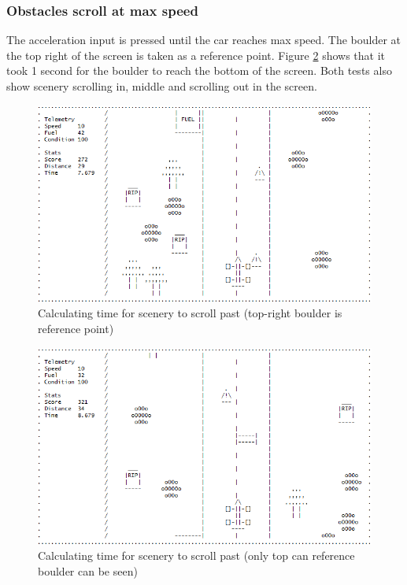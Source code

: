 \documentclass{article}
\begin{document}
\subsubsection*{Obstacles scroll at max speed}
The acceleration input is pressed until the car reaches max speed. The boulder at the top right of the screen is taken as a reference point. Figure \ref{fig:obs_test_maxspeedscroll2} shows that it took 1 second for the boulder to reach the bottom of the screen. Both tests also show scenery scrolling in, middle and scrolling out in the screen.
\begin{figure}[!ht]
	\begin{center}
	\includegraphics[width=0.63\paperwidth]{images/obs_test_maxspeedscroll}
	\caption{Calculating time for scenery to scroll past (top-right boulder is reference point)}
	\label{fig:obs_test_maxspeedscroll} 
	\end{center}
\end{figure}
\begin{figure}[!ht]
	\begin{center}
	\includegraphics[width=0.63\paperwidth]{images/obs_test_maxspeedscroll2}
	\caption{Calculating time for scenery to scroll past (only top can reference boulder can be seen)}
	\label{fig:obs_test_maxspeedscroll2} 
	\end{center}
\end{figure}
\clearpage
\end{document}
